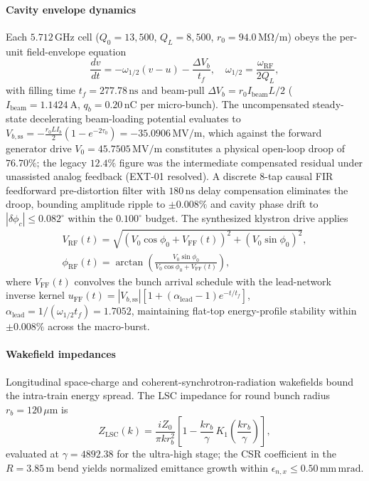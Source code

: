 \documentclass[11pt,journal,compsoc]{IEEEtran}
\begin{document}
\paragraph{Cavity envelope dynamics}
Each $5.712\,\mathrm{GHz}$ cell ($Q_0 = 13{,}500$, $Q_L = 8{,}500$,
$r_0 = 94.0\,\mathrm{M\Omega/m}$) obeys the per-unit field-envelope
equation
\begin{equation}
\frac{dv}{dt} = -\omega_{1/2}\left(v - u\right) - \frac{\Delta V_b}{t_f},
\quad \omega_{1/2} = \frac{\omega_{\mathrm{RF}}}{2Q_L},
\label{eq:cavity}
\end{equation}
with filling time $t_f = 277.78\,\mathrm{ns}$ and beam-pull
$\Delta V_b = r_0 I_{\mathrm{beam}} L/2$ ($I_{\mathrm{beam}} = 1.1424\
\mathrm{A}$, $q_b = 0.20\,\mathrm{nC}$ per micro-bunch). The
uncompensated steady-state decelerating beam-loading potential evaluates
to $V_{b,\mathrm{ss}} = -\frac{r_0 L I_b}{2}(1 - e^{-2\tau_0}) =
-35.0906\,\mathrm{MV/m}$, which against the forward generator drive
$V_0 = 45.7505\,\mathrm{MV/m}$ constitutes a physical open-loop droop of
$76.70\%$; the legacy $12.4\%$ figure was the intermediate compensated
residual under unassisted analog feedback (EXT-01 resolved). A discrete
8-tap causal FIR feedforward pre-distortion filter with $180\,\mathrm{ns}$
delay compensation eliminates the droop, bounding amplitude ripple to
$\pm 0.008\%$ and cavity phase drift to $|\delta\phi_c| \le
0.082^{\circ}$ within the $0.100^{\circ}$ budget. The synthesized
klystron drive applies
\begin{gather}
V_{\mathrm{RF}}(t) = \sqrt{\left(V_0\cos\phi_0 + V_{\mathrm{FF}}(t)
\right)^2 + \left(V_0\sin\phi_0\right)^2},\\
\phi_{\mathrm{RF}}(t) = \arctan\!\left(
\frac{V_0\sin\phi_0}{V_0\cos\phi_0 + V_{\mathrm{FF}}(t)}\right),
\end{gather}
where $V_{\mathrm{FF}}(t)$ convolves the bunch arrival schedule with the
lead-network inverse kernel $u_{\mathrm{FF}}(t) = |V_{b,\mathrm{ss}}|
\left[1 + (\alpha_{\mathrm{lead}} - 1)e^{-t/t_f}\right]$,
$\alpha_{\mathrm{lead}} = 1/(\omega_{1/2}t_f) = 1.7052$, maintaining
flat-top energy-profile stability within $\pm 0.008\%$ across the
macro-burst.

\paragraph{Wakefield impedances}
Longitudinal space-charge and coherent-synchrotron-radiation wakefields
bound the intra-train energy spread. The LSC impedance for round bunch
radius $r_b = 120\,\mu\mathrm{m}$ is
\begin{equation}
Z_{\mathrm{LSC}}(k) = \frac{iZ_0}{\pi k r_b^2}
\left[1 - \frac{k r_b}{\gamma}\,
K_1\!\left(\frac{k r_b}{\gamma}\right)\right],
\label{eq:lsc}
\end{equation}
evaluated at $\gamma = 4892.38$ for the ultra-high stage; the CSR
coefficient in the $R = 3.85\,\mathrm{m}$ bend yields normalized
emittance growth within $\epsilon_{n,x} \le 0.50\,\mathrm{mm\,mrad}$.
\end{document}
